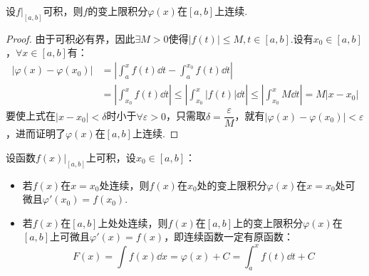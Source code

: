 \begin{theorem}
    \label{thm:VariableLimitIntegralContinuity}
    设$\left.f\right|_{[a,b]}$可积，则$f$的变上限积分$\varphi(x)$在$[a,b]$上连续.
\end{theorem}

\begin{proof}
    由于可积必有界，因此$\exists M>0$使得$|f(t)|\leqslant M,t\in [a,b]$.设有$x_0\in[a,b]$，$\forall x \in[a,b]$有：
    \begin{align*}
        |\varphi(x) - \varphi(x_0)| &= \left|\int_{a}^{x}f(t)\dd{t} - \int_{a}^{x_0}f(t)\dd{t}\right|\\
        &= \left|\int_{x_0}^{x}f(t)\dd{t}\right| \leqslant \left|\int_{x_0}^{x}|f(t)|\dd{t}\right| \leqslant \left|\int_{x_0}^{x}M\dd{t}\right| = M|x-x_0|
    \end{align*}
    要使上式在$|x-x_0|<\delta$时小于$\forall \varepsilon > 0$，只需取$\delta = \dfrac{\varepsilon}{M}$，就有$|\varphi(x)-\varphi(x_0)|<\varepsilon$，进而证明了$\varphi(x)$在$[a,b]$上连续.
\end{proof}

\begin{theorem}
    \label{thm:VariableLimitIntegralDerivative}
    设函数$\left.f(x)\right|_{[a,b]}$上可积，设$x_0 \in [a,b]$：
    \begin{itemize}
        \item 若$f(x)$在$x=x_0$处连续，则$f(x)$在$x_0$处的变上限积分$\varphi(x)$在$x=x_0$处可微且$\varphi'(x_0) = f(x_0)$.
        \item 若$f(x)$在$[a,b]$上处处连续，则$f(x)$在$[a,b]$上的变上限积分$\varphi(x)$在$[a,b]$上可微且$\varphi'(x) = f(x)$，即连续函数一定有原函数：
        \[F(x) = \int f(x)\dd{x} = \varphi(x) + C = \int_{a}^{x} f(t)\dd{t} + C\]
    \end{itemize}
\end{theorem}

